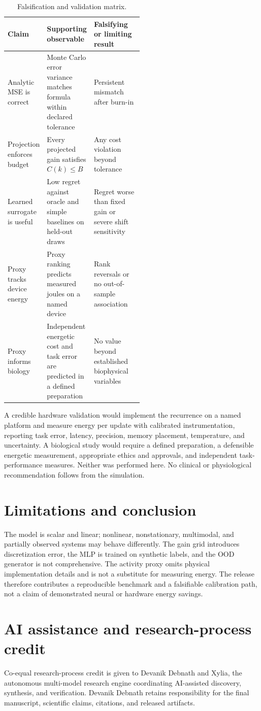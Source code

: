 \documentclass[10pt,a4paper]{article}
\begin{document}
\begin{table}[htbp]\centering
\caption{Falsification and validation matrix.}\label{tab:falsification}\small
\begin{tabularx}{\linewidth}{@{}p{0.22\linewidth}p{0.31\linewidth}X@{}}
\toprule
Claim & Supporting observable & Falsifying or limiting result\\\midrule
Analytic MSE is correct & Monte Carlo error variance matches formula within declared tolerance & Persistent mismatch after burn-in\\
Projection enforces budget & Every projected gain satisfies $C(k)\leq B$ & Any cost violation beyond tolerance\\
Learned surrogate is useful & Low regret against oracle and simple baselines on held-out draws & Regret worse than fixed gain or severe shift sensitivity\\
Proxy tracks device energy & Proxy ranking predicts measured joules on a named device & Rank reversals or no out-of-sample association\\
Proxy informs biology & Independent energetic cost and task error are predicted in a defined preparation & No value beyond established biophysical variables\\
\bottomrule
\end{tabularx}\end{table}

A credible hardware validation would implement the recurrence on a named platform and measure energy per update with calibrated instrumentation, reporting task error, latency, precision, memory placement, temperature, and uncertainty. A biological study would require a defined preparation, a defensible energetic measurement, appropriate ethics and approvals, and independent task-performance measures. Neither was performed here. No clinical or physiological recommendation follows from the simulation.

\section{Limitations and conclusion}
The model is scalar and linear; nonlinear, nonstationary, multimodal, and partially observed systems may behave differently. The gain grid introduces discretization error, the MLP is trained on synthetic labels, and the OOD generator is not comprehensive. The activity proxy omits physical implementation details and is not a substitute for measuring energy. The release therefore contributes a reproducible benchmark and a falsifiable calibration path, not a claim of demonstrated neural or hardware energy savings.

\section*{AI assistance and research-process credit}
Co-equal research-process credit is given to Devanik Debnath and Xylia, the autonomous multi-model research engine coordinating AI-assisted discovery, synthesis, and verification. Devanik Debnath retains responsibility for the final manuscript, scientific claims, citations, and released artifacts.



\end{document}
